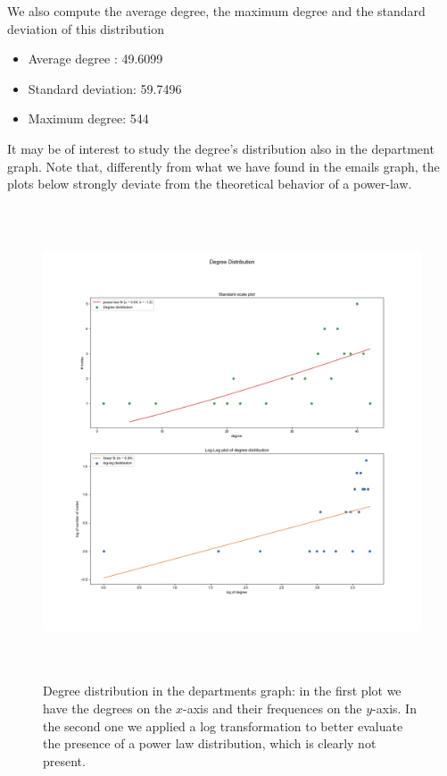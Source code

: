 \documentclass{report}
\theoremstyle{definition}
\theoremstyle{remark}
\begin{document}
We also compute the average degree, the maximum degree and the standard deviation of this distribution
\begin{itemize}
	\item Average degree : 49.6099
	\item Standard deviation: 59.7496
	\item Maximum degree: 544
\end{itemize}
It may be of interest to study the degree's distribution also in the department graph. Note that, differently from what we have found in the emails graph, the plots below strongly deviate from the theoretical behavior of a power-law.
\begin{figure} [H]
	\centering
	\centerline{\includegraphics[width = 18cm, height = 14cm, keepaspectratio]{DEP_degree_distribution.png}}	\caption{Degree distribution in the departments graph: in the first plot we have the degrees on the $x$-axis and their frequences on the $y$-axis. In the second one we applied a log transformation to better evaluate the presence of a power law distribution, which is clearly not present.}
\end{figure}
\newpage
\end{document}
